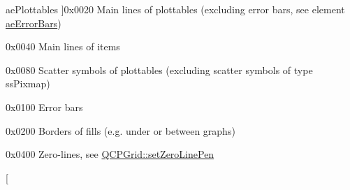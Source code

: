 \begin{Desc}
\begin{description}
{\hypertarget{namespaceQCP_ae55dbe315d41fe80f29ba88100843a0ca4145e4251b0cf2dbedabeea0a38f84f6}{}ae\+Plottables\label{namespaceQCP_ae55dbe315d41fe80f29ba88100843a0ca4145e4251b0cf2dbedabeea0a38f84f6}
}]{\ttfamily 0x0020} Main lines of plottables (excluding error bars, see element \hyperlink{namespaceQCP_ae55dbe315d41fe80f29ba88100843a0ca9dcf3882cb321bb305f71fdc0f09f63d}{ae\+Error\+Bars}) \item[{\em 
\hypertarget{namespaceQCP_ae55dbe315d41fe80f29ba88100843a0caf7712a85d6b0c75b24301d2fe9484db3}{}ae\+Items\label{namespaceQCP_ae55dbe315d41fe80f29ba88100843a0caf7712a85d6b0c75b24301d2fe9484db3}
}]{\ttfamily 0x0040} Main lines of items \item[{\em 
\hypertarget{namespaceQCP_ae55dbe315d41fe80f29ba88100843a0cae45ed8cd167bffe27d7f40da4bc17e9c}{}ae\+Scatters\label{namespaceQCP_ae55dbe315d41fe80f29ba88100843a0cae45ed8cd167bffe27d7f40da4bc17e9c}
}]{\ttfamily 0x0080} Scatter symbols of plottables (excluding scatter symbols of type ss\+Pixmap) \item[{\em 
\hypertarget{namespaceQCP_ae55dbe315d41fe80f29ba88100843a0ca9dcf3882cb321bb305f71fdc0f09f63d}{}ae\+Error\+Bars\label{namespaceQCP_ae55dbe315d41fe80f29ba88100843a0ca9dcf3882cb321bb305f71fdc0f09f63d}
}]{\ttfamily 0x0100} Error bars \item[{\em 
\hypertarget{namespaceQCP_ae55dbe315d41fe80f29ba88100843a0ca788810f0aa930137de6ad6cc6d83d354}{}ae\+Fills\label{namespaceQCP_ae55dbe315d41fe80f29ba88100843a0ca788810f0aa930137de6ad6cc6d83d354}
}]{\ttfamily 0x0200} Borders of fills (e.\+g. under or between graphs) \item[{\em 
\hypertarget{namespaceQCP_ae55dbe315d41fe80f29ba88100843a0ca261f8ea78cf3c9561726223ffa33dc12}{}ae\+Zero\+Line\label{namespaceQCP_ae55dbe315d41fe80f29ba88100843a0ca261f8ea78cf3c9561726223ffa33dc12}
}]{\ttfamily 0x0400} Zero-\/lines, see \hyperlink{classQCPGrid_a209f40fdb252397b418b82d3494d8ea0}{Q\+C\+P\+Grid\+::set\+Zero\+Line\+Pen} \item[{\em 
}
\end{description}
\end{Desc}
